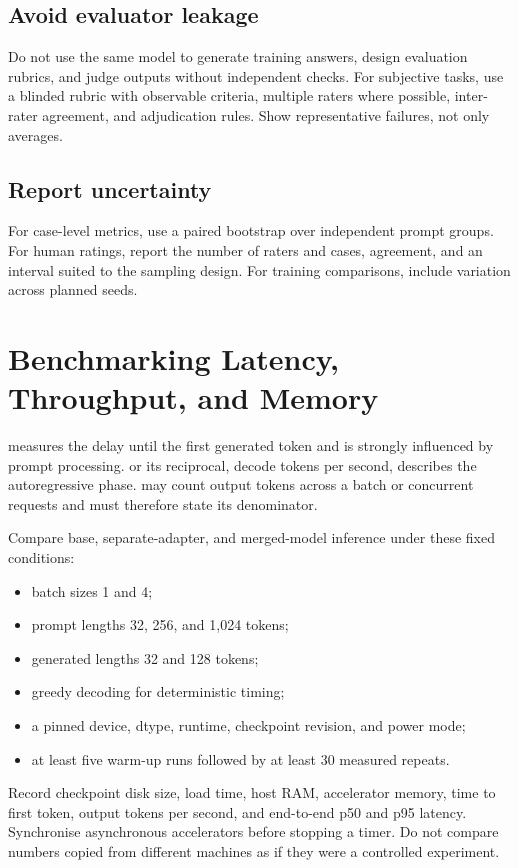 \subsection{Avoid evaluator leakage}

Do not use the same model to generate training answers, design evaluation
rubrics, and judge outputs without independent checks.
For subjective tasks, use a blinded rubric with observable criteria, multiple
raters where possible, inter-rater agreement, and adjudication rules.
Show representative failures, not only averages.

\subsection{Report uncertainty}

For case-level metrics, use a paired bootstrap over independent prompt groups.
For human ratings, report the number of raters and cases, agreement, and an
interval suited to the sampling design.
For training comparisons, include variation across planned seeds.

\section{Benchmarking Latency, Throughput, and Memory}

 measures the delay until the first generated
token and is strongly influenced by prompt processing.
 or its reciprocal, decode tokens per second,
describes the autoregressive phase.
 may count output tokens across a batch or concurrent
requests and must therefore state its denominator.

\begin{practicallab}
Compare base, separate-adapter, and merged-model inference under these fixed
conditions:
\begin{itemize}
    \item batch sizes 1 and 4;
    \item prompt lengths 32, 256, and 1,024 tokens;
    \item generated lengths 32 and 128 tokens;
    \item greedy decoding for deterministic timing;
    \item a pinned device, dtype, runtime, checkpoint revision, and power mode;
    \item at least five warm-up runs followed by at least 30 measured repeats.
\end{itemize}

Record checkpoint disk size, load time, host RAM, accelerator memory, time to
first token, output tokens per second, and end-to-end p50 and p95 latency.
Synchronise asynchronous accelerators before stopping a timer.
Do not compare numbers copied from different machines as if they were a
controlled experiment.
\end{practicallab}


